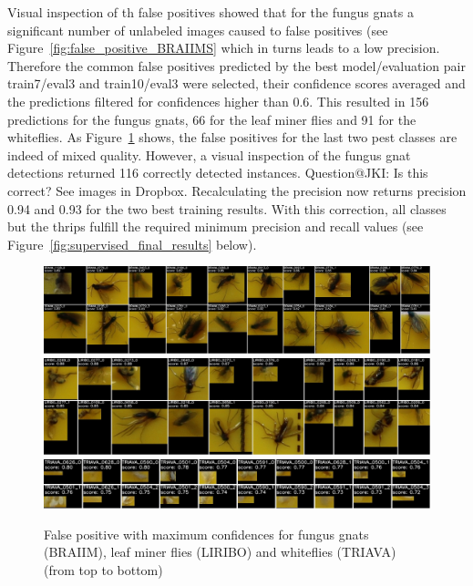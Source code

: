 \documentclass[12pt,a4paper]{article}
\begin{document}
Visual inspection of th false positives showed that for the fungus gnats a significant number of unlabeled images caused to false positives (see Figure~\ref{fig:false_positive_BRAIIMS} which in turns leads to a low precision. Therefore the common false positives predicted by the best model/evaluation pair train7/eval3 and train10/eval3 were selected, their confidence scores averaged and the predictions filtered for confidences higher than 0.6. This resulted in 156 predictions for the fungus gnats, 66 for the leaf miner flies and 91 for the whiteflies. As Figure~\ref{fig:fp_best_confidences} shows, the false positives for the last two pest classes are indeed of mixed quality. However, a visual inspection of the fungus gnat detections returned 116 correctly detected instances. {\color{red} Question@JKI: Is this correct? See images in Dropbox.} Recalculating the precision now returns precision 0.94 and 0.93 for the two best training results. With this correction, all classes but the thrips fulfill the required minimum precision and recall values (see Figure~\ref{fig:supervised_final_results} below).

\begin{figure}[h!]
    \centering
    \includegraphics[width=\textwidth]{images/BRAIIM_fp_canvas_1.jpg} %
    \includegraphics[width=\textwidth]{images/LIRIBO_fp_canvas_1.jpg} %
    \includegraphics[width=\textwidth]{images/TRIAVA_fp_canvas_1.jpg} %
    \caption{False positive with maximum confidences for fungus gnats (BRAIIM), leaf miner flies (LIRIBO) and whiteflies (TRIAVA) (from top to bottom)}
    \label{fig:fp_best_confidences}
\end{figure}
\end{document}
